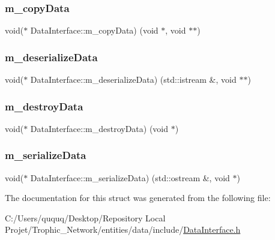 \subsubsection{\texorpdfstring{m\+\_\+copy\+Data}{m\_copyData}}
{\footnotesize\ttfamily void($\ast$ Data\+Interface\+::m\+\_\+copy\+Data) (void $\ast$, void $\ast$$\ast$)}

\mbox{\label{struct_data_interface_a53674c91ee0983fb20429291631d88f0}} 
\subsubsection{\texorpdfstring{m\+\_\+deserialize\+Data}{m\_deserializeData}}
{\footnotesize\ttfamily void($\ast$ Data\+Interface\+::m\+\_\+deserialize\+Data) (std\+::istream \&, void $\ast$$\ast$)}

\mbox{\label{struct_data_interface_af6e607324293e0206fda4acbdfafe043}} 
\subsubsection{\texorpdfstring{m\+\_\+destroy\+Data}{m\_destroyData}}
{\footnotesize\ttfamily void($\ast$ Data\+Interface\+::m\+\_\+destroy\+Data) (void $\ast$)}

\mbox{\label{struct_data_interface_a111a5b62fe0a45d937795853c8337d06}} 
\subsubsection{\texorpdfstring{m\+\_\+serialize\+Data}{m\_serializeData}}
{\footnotesize\ttfamily void($\ast$ Data\+Interface\+::m\+\_\+serialize\+Data) (std\+::ostream \&, void $\ast$)}



The documentation for this struct was generated from the following file\+:\begin{DoxyCompactItemize}
\item 
C\+:/\+Users/ququq/\+Desktop/\+Repository Local Projet/\+Trophic\+\_\+\+Network/entities/data/include/\mbox{\hyperlink{_data_interface_8h}{Data\+Interface.\+h}}\end{DoxyCompactItemize}
